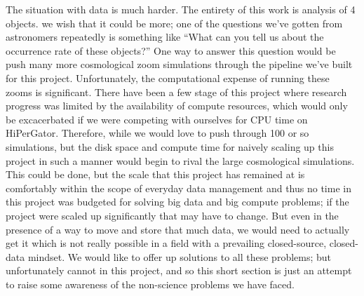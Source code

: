 The situation with data is much harder.
The entirety of this work is analysis of 4 objects.
we wish that it could be more; one of the questions we've gotten from astronomers repeatedly is something like ``What can you tell us about the occurrence rate of these objects?''
One way to answer this question would be push many more cosmological zoom simulations through the pipeline we've built for this project.
Unfortunately, the computational expense of running these zooms is significant.
There have been a few stage of this project where research progress was limited by the availability of compute resources, which would only be excacerbated if we were competing with ourselves for CPU time on HiPerGator.
Therefore, while we would love to push through 100 or so simulations, but the disk space and compute time for naively scaling up this project in such a manner would begin to rival the large cosmological simulations.
This could be done, but the scale that this project has remained at is comfortably within the scope of everyday data management and thus no time in this project was budgeted for solving big data and big compute problems; if the project were scaled up significantly that may have to change.
But even in the presence of a way to move and store that much data, we would need to actually get it which is not really possible in a field with a prevailing closed-source, closed-data mindset.
We would like to offer up solutions to all these problems; but unfortunately cannot in this project, and so this short section is just an attempt to raise some awareness of the non-science problems we have faced.
